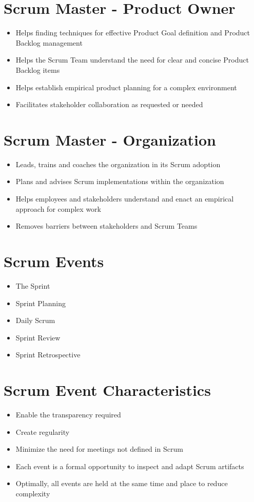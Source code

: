 \documentclass[a4paper,11pt,twocolumn]{article}
\begin{document}
\section*{Scrum Master - Product Owner}
\begin{itemize}
	\item Helps finding techniques for effective Product Goal definition and Product Backlog management
	\item Helps the Scrum Team understand the need for clear and concise Product Backlog items
	\item Helps establish empirical product planning for a complex environment
	\item Facilitates stakeholder collaboration as requested or needed
\end{itemize}

\section*{Scrum Master - Organization}
\begin{itemize}
	\item Leads, trains and coaches the organization in its Scrum adoption
	\item Plans and advises Scrum implementations within the organization
	\item Helps employees and stakeholders understand and enact an empirical approach for complex work
	\item Removes barriers between stakeholders and Scrum Teams
\end{itemize}

\section*{Scrum Events}
\begin{itemize}
	\item The Sprint
	\item Sprint Planning
	\item Daily Scrum
	\item Sprint Review
	\item Sprint Retrospective
\end{itemize}

\section*{Scrum Event Characteristics}
\begin{itemize}
	\item Enable the transparency required
	\item Create regularity
	\item Minimize the need for meetings not defined in Scrum
	\item Each event is a formal opportunity to inspect and adapt Scrum artifacts
	\item Optimally, all events are held at the same time and place to reduce complexity
\end{itemize}
\end{document}
